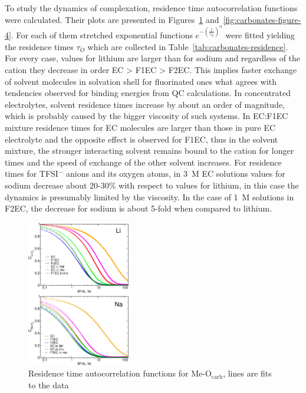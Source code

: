 To study the dynamics of complexation, residence time autocorrelation functions were calculated. Their plots are presented in Figures~\ref{fig:carbonates-figure-3} and~\ref{fig:carbonates-figure-4}. For each of them stretched exponential functions $e^{-\left( \frac{t}{\tau_O} \right)^{\alpha}}$ were fitted yielding the residence times $\tau_O$ which are collected in Table~\ref{tab:carbonates-residence}. For every case, values for lithium are larger than for sodium and regardless of the cation they decrease in order EC > F1EC > F2EC. This implies faster exchange of solvent molecules in solvation shell for fluorinated ones what agrees with tendencies observed for binding energies from QC calculations. In concentrated electrolytes, solvent residence times increase by about an order of magnitude, which is probably caused by the bigger viscosity of such systems. In EC:F1EC mixture residence times for EC molecules are larger than those in pure EC electrolyte and the opposite effect is observed for F1EC, thus in the solvent mixture, the stronger interacting solvent remains bound to the cation for longer times and the speed of exchange of the other solvent increases. For residence times for TFSI$^{-}$ anions and its oxygen atoms, in 3~M EC solutions values for sodium decrease about 20-30\% with respect to values for lithium, in this case the dynamics is presumably limited by the viscosity. In the case of 1~M solutions in F2EC, the decrease for sodium is about 5-fold when compared to lithium. 

\begin{figure}[H]
    \centering
    \includegraphics[width=0.4\textwidth]{img/3-structural-data-from-md-simulations/4-carbonates/figure3.png}
    \singlespacing
    \caption{Residence time autocorrelation functions for Me-O$_{\text{carb}}$, lines are fits to the data}
    \label{fig:carbonates-figure-3}
\end{figure}


